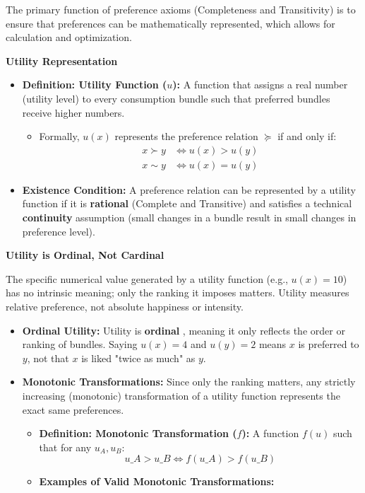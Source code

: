 \documentclass{article}
\begin{document}
The primary function of preference axioms (Completeness and Transitivity) is to ensure that preferences can be mathematically represented, which allows for calculation and optimization.

\textbf{Utility Representation}
\begin{itemize}
    \item \textbf{Definition: Utility Function ($u$):} A function that assigns a real number (utility level) to every consumption bundle such that preferred bundles receive higher numbers.
    \begin{itemize}
        \item Formally, $u(x)$ represents the preference relation $\succeq$ if and only if: \begin{align*} x \succ y &\iff u(x) > u(y) \\ x \sim y &\iff u(x) = u(y) \end{align*}
    \end{itemize}
    \item \textbf{Existence Condition:} A preference relation can be represented by a utility function if it is \textbf{rational} (Complete and Transitive) and satisfies a technical \textbf{continuity} assumption (small changes in a bundle result in small changes in preference level).
\end{itemize}

\textbf{Utility is Ordinal, Not Cardinal}

The specific numerical value generated by a utility function (e.g., $u(x)=10$) has no intrinsic meaning; only the ranking it imposes matters. Utility measures relative preference, not absolute happiness or intensity.

\begin{itemize}
    \item \textbf{Ordinal Utility:} Utility is \textbf{ordinal} , meaning it only reflects the order or ranking of bundles. Saying $u(x)=4$ and $u(y)=2$ means $x$ is preferred to $y$, not that $x$ is liked "twice as much" as $y$.
    \item \textbf{Monotonic Transformations:} Since only the ranking matters, any strictly increasing (monotonic) transformation of a utility function represents the exact same preferences.
    \begin{itemize}
        \item \textbf{Definition: Monotonic Transformation ($f$):} A function $f(u)$ such that for any $u_A, u_B$: \[u\_A > u\_B \iff f(u\_A) > f(u\_B)\]
        \item \textbf{Examples of Valid Monotonic Transformations:}
    \end{itemize}
\end{itemize}
\end{document}
